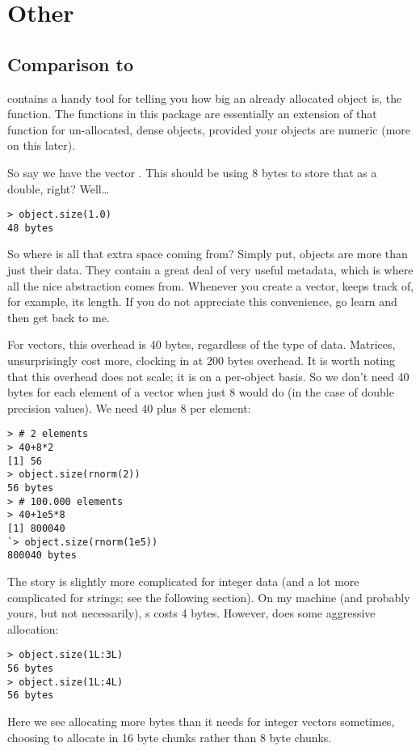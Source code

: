 \section{Other}

\subsection{Comparison to }

 contains a handy tool for telling you how big an already allocated object is, the  function.  The functions in this package are essentially an extension of that function for un-allocated, dense objects, provided your objects are numeric (more on this later).

So say we have the vector .  This should be using 8 bytes to store that  as a double, right?  Well\dots
\begin{lstlisting}[language=rr]
> object.size(1.0)
48 bytes
\end{lstlisting}

So where is all that extra space coming from?  Simply put,  objects are more than just their data.  They contain a great deal of very useful metadata, which is where all the nice abstraction comes from.  Whenever you create a vector,  keeps track of, for example, its length.  If you do not appreciate this convenience, go learn  and then get back to me.  

For vectors, this overhead is 40 bytes, regardless of the type of data.  Matrices, unsurprisingly cost more, clocking in at 200 bytes overhead.  It is worth noting that this overhead does not scale; it is on a per-object basis.  So we don't need 40 bytes for each element of a vector when just 8 would do (in the case of double precision values).  We need 40 plus 8 per element:
\begin{lstlisting}[language=rr]
> # 2 elements
> 40+8*2
[1] 56
> object.size(rnorm(2))
56 bytes
> # 100.000 elements
> 40+1e5*8
[1] 800040
`> object.size(rnorm(1e5))
800040 bytes
\end{lstlisting}

The story is slightly more complicated for integer data (and a lot more complicated for strings; see the following section).  On my machine (and probably yours, but not necessarily), s costs 4 bytes.  However,  does some aggressive allocation:
\begin{lstlisting}[language=rr]
> object.size(1L:3L)
56 bytes
> object.size(1L:4L)
56 bytes
\end{lstlisting}
Here we see  allocating more bytes than it needs for integer vectors sometimes, choosing to allocate in 16 byte chunks rather than 8 byte chunks.

